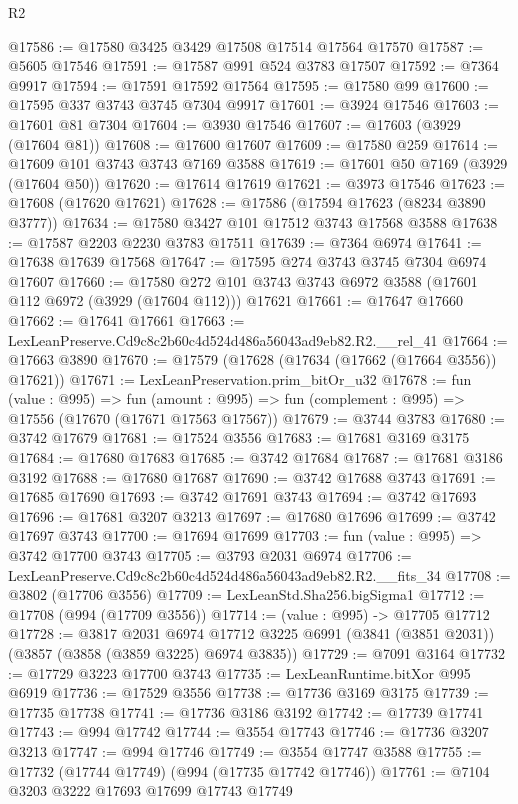 \begin{lexlean}{R2}
\begin{coremodule}
@17586 := @17580 @3425 @3429 @17508 @17514 @17564 @17570
@17587 := @5605 @17546
@17591 := @17587 @991 @524 @3783 @17507
@17592 := @7364 @9917
@17594 := @17591 @17592 @17564
@17595 := @17580 @99
@17600 := @17595 @337 @3743 @3745 @7304 @9917
@17601 := @3924 @17546
@17603 := @17601 @81 @7304
@17604 := @3930 @17546
@17607 := @17603 (@3929 (@17604 @81))
@17608 := @17600 @17607
@17609 := @17580 @259
@17614 := @17609 @101 @3743 @3743 @7169 @3588
@17619 := @17601 @50 @7169 (@3929 (@17604 @50))
@17620 := @17614 @17619
@17621 := @3973 @17546
@17623 := @17608 (@17620 @17621)
@17628 := @17586 (@17594 @17623 (@8234 @3890 @3777))
@17634 := @17580 @3427 @101 @17512 @3743 @17568 @3588
@17638 := @17587 @2203 @2230 @3783 @17511
@17639 := @7364 @6974
@17641 := @17638 @17639 @17568
@17647 := @17595 @274 @3743 @3745 @7304 @6974 @17607
@17660 := @17580 @272 @101 @3743 @3743 @6972 @3588 (@17601 @112 @6972 (@3929 (@17604 @112))) @17621
@17661 := @17647 @17660
@17662 := @17641 @17661
@17663 := LexLeanPreserve.Cd9c8c2b60c4d524d486a56043ad9eb82.R2.__rel_41
@17664 := @17663 @3890
@17670 := @17579 (@17628 (@17634 (@17662 (@17664 @3556)) @17621))
@17671 := LexLeanPreservation.prim_bitOr_u32
@17678 := fun (value : @995) =>
  fun (amount : @995) => fun (complement : @995) => @17556 (@17670 (@17671 @17563 @17567))
@17679 := @3744 @3783
@17680 := @3742 @17679
@17681 := @17524 @3556
@17683 := @17681 @3169 @3175
@17684 := @17680 @17683
@17685 := @3742 @17684
@17687 := @17681 @3186 @3192
@17688 := @17680 @17687
@17690 := @3742 @17688 @3743
@17691 := @17685 @17690
@17693 := @3742 @17691 @3743
@17694 := @3742 @17693
@17696 := @17681 @3207 @3213
@17697 := @17680 @17696
@17699 := @3742 @17697 @3743
@17700 := @17694 @17699
@17703 := fun (value : @995) => @3742 @17700 @3743
@17705 := @3793 @2031 @6974
@17706 := LexLeanPreserve.Cd9c8c2b60c4d524d486a56043ad9eb82.R2.__fits_34
@17708 := @3802 (@17706 @3556)
@17709 := LexLeanStd.Sha256.bigSigma1
@17712 := @17708 (@994 (@17709 @3556))
@17714 := (value : @995) -> @17705 @17712
@17728 := @3817
    @2031
    @6974
    @17712
    @3225
    @6991
    (@3841 (@3851 @2031))
    (@3857 (@3858 (@3859 @3225) @6974 @3835))
@17729 := @7091 @3164
@17732 := @17729 @3223 @17700 @3743
@17735 := LexLeanRuntime.bitXor @995 @6919
@17736 := @17529 @3556
@17738 := @17736 @3169 @3175
@17739 := @17735 @17738
@17741 := @17736 @3186 @3192
@17742 := @17739 @17741
@17743 := @994 @17742
@17744 := @3554 @17743
@17746 := @17736 @3207 @3213
@17747 := @994 @17746
@17749 := @3554 @17747 @3588
@17755 := @17732 (@17744 @17749) (@994 (@17735 @17742 @17746))
@17761 := @7104 @3203 @3222 @17693 @17699 @17743 @17749

\end{coremodule}
\end{lexlean}
